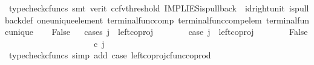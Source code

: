 \begin{isabellebody}
\ {\isacharparenleft}{\kern0pt}typecheck{\isacharunderscore}{\kern0pt}cfuncs{\isacharcomma}{\kern0pt}\ smt\ {\isacharparenleft}{\kern0pt}verit{\isacharcomma}{\kern0pt}\ ccfv{\isacharunderscore}{\kern0pt}threshold{\isacharparenright}{\kern0pt}\ IMPLIES{\isacharunderscore}{\kern0pt}is{\isacharunderscore}{\kern0pt}pullback\ \ id{\isacharunderscore}{\kern0pt}right{\isacharunderscore}{\kern0pt}unit{}\ is{\isacharunderscore}{\kern0pt}pullback{\isacharunderscore}{\kern0pt}def\ one{\isacharunderscore}{\kern0pt}unique{\isacharunderscore}{\kern0pt}element\ terminal{\isacharunderscore}{\kern0pt}func{\isacharunderscore}{\kern0pt}comp\ terminal{\isacharunderscore}{\kern0pt}func{\isacharunderscore}{\kern0pt}comp{\isacharunderscore}{\kern0pt}elem\ terminal{\isacharunderscore}{\kern0pt}func{\isacharunderscore}{\kern0pt}unique{\isacharparenright}{\kern0pt}\isanewline
\ \ \isamarkupfalse%
\ False\isanewline
\ \ \isamarkupfalse%
{\isacharparenleft}{\kern0pt}cases\ {\isachardoublequoteopen}j\ {\isacharequal}{\kern0pt}\ left{\isacharunderscore}{\kern0pt}coproj\ {\isasymone}\ {\isacharparenleft}{\kern0pt}{\isasymone}{\isasymCoprod}{\isasymone}{\isacharparenright}{\kern0pt}{\isachardoublequoteclose}{\isacharparenright}{\kern0pt}\isanewline
\ \ \ \ \isamarkupfalse%
\ case{}{\isacharcolon}{\kern0pt}\ {\isachardoublequoteopen}j\ {\isacharequal}{\kern0pt}\ left{\isacharunderscore}{\kern0pt}coproj\ {\isasymone}\ {\isacharparenleft}{\kern0pt}{\isasymone}{\isasymCoprod}{\isasymone}{\isacharparenright}{\kern0pt}{\isachardoublequoteclose}\isanewline
\ \ \ \ \isamarkupfalse%
\ False\isanewline
\ \ \ \ \isamarkupfalse%
\ {\isacharminus}{\kern0pt}\ \isanewline
\ \ \ \ \ \ \isamarkupfalse%
\ {\isachardoublequoteopen}{\isacharparenleft}{\kern0pt}{\isasymlangle}{\isasymt}{\isacharcomma}{\kern0pt}\ {\isasymt}{\isasymrangle}{\isasymamalg}\ {\isacharparenleft}{\kern0pt}{\isasymlangle}{\isasymf}{\isacharcomma}{\kern0pt}\ {\isasymf}{\isasymrangle}\ {\isasymamalg}{\isasymlangle}{\isasymf}{\isacharcomma}{\kern0pt}\ {\isasymt}{\isasymrangle}{\isacharparenright}{\kern0pt}{\isacharparenright}{\kern0pt}\ {\isasymcirc}\isactrlsub c\ j\ {\isacharequal}{\kern0pt}\ {\isasymlangle}{\isasymt}{\isacharcomma}{\kern0pt}\ {\isasymt}{\isasymrangle}{\isachardoublequoteclose}\isanewline
\ \ \ \ \ \ \ \ \isamarkupfalse%
\ {\isacharparenleft}{\kern0pt}typecheck{\isacharunderscore}{\kern0pt}cfuncs{\isacharcomma}{\kern0pt}\ simp\ add{\isacharcolon}{\kern0pt}\ case{}\ left{\isacharunderscore}{\kern0pt}coproj{\isacharunderscore}{\kern0pt}cfunc{\isacharunderscore}{\kern0pt}coprod{\isacharparenright}{\kern0pt}\isanewline

\end{isabellebody}
